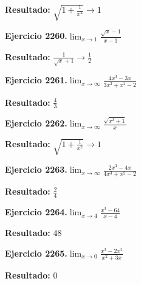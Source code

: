 \documentclass[10pt,a4paper]{article}
\begin{document}
\begin{solbox}
\textbf{Resultado:} \(\displaystyle \sqrt{1+\frac{1}{x^2}} \to 1\)
\end{solbox}

\begin{ejbox}
\textbf{Ejercicio 2260.}\quad $\lim_{x\to 1} \frac{\sqrt{x}-1}{x-1}$
\end{ejbox}

\begin{solbox}
\textbf{Resultado:} \(\displaystyle \frac{1}{\sqrt{x}+1} \to \frac{1}{2}\)
\end{solbox}

\newpage
\begin{ejbox}
\textbf{Ejercicio 2261.}\quad $\lim_{x\to \infty} \frac{4x^3 - 3x}{3x^3 + x^2 - 2}$
\end{ejbox}

\begin{solbox}
\textbf{Resultado:} \(\displaystyle \frac{4}{3}\)
\end{solbox}

\begin{ejbox}
\textbf{Ejercicio 2262.}\quad $\lim_{x\to \infty} \frac{\sqrt{x^2+1}}{x}$
\end{ejbox}

\begin{solbox}
\textbf{Resultado:} \(\displaystyle \sqrt{1+\frac{1}{x^2}} \to 1\)
\end{solbox}

\begin{ejbox}
\textbf{Ejercicio 2263.}\quad $\lim_{x\to \infty} \frac{2x^3 - 4x}{4x^3 + x^2 - 2}$
\end{ejbox}

\begin{solbox}
\textbf{Resultado:} \(\displaystyle \frac{2}{4}\)
\end{solbox}

\newpage
\begin{ejbox}
\textbf{Ejercicio 2264.}\quad $\lim_{x\to 4} \frac{x^3-64}{x-4}$
\end{ejbox}

\begin{solbox}
\textbf{Resultado:} \(\displaystyle 48\)
\end{solbox}

\begin{ejbox}
\textbf{Ejercicio 2265.}\quad $\lim_{x\to 0} \frac{x^3-2x^2}{x^2+3x}$
\end{ejbox}

\begin{solbox}
\textbf{Resultado:} \(\displaystyle 0\)
\end{solbox}
\end{document}
